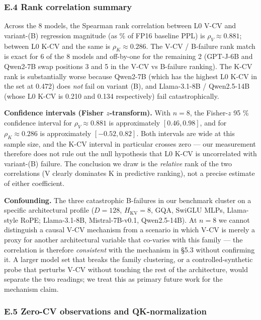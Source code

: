\subsubsection{E.4 Rank correlation
summary}\label{e.4-rank-correlation-summary}

Across the 8 models, the Spearman rank correlation between L0 V-CV and
variant-(B) regression magnitude (as \% of FP16 baseline PPL) is
\(\rho_V \approx 0.881\); between L0 K-CV and the same is
\(\rho_K \approx 0.286\). The V-CV / B-failure rank match is exact for 6
of the 8 models and off-by-one for the remaining 2 (GPT-J-6B and
Qwen2-7B swap positions 3 and 5 in the V-CV vs B-failure ranking). The
K-CV rank is substantially worse because Qwen2-7B (which has the highest
L0 K-CV in the set at 0.472) does \emph{not} fail on variant (B), and
Llama-3.1-8B / Qwen2.5-14B (whose L0 K-CV is 0.210 and 0.134
respectively) fail catastrophically.

\textbf{Confidence intervals (Fisher \(z\)-transform).} With \(n = 8\),
the Fisher-\(z\) 95 \% confidence interval for \(\rho_V \approx 0.881\)
is approximately \([0.46, 0.98]\), and for \(\rho_K \approx 0.286\) is
approximately \([-0.52, 0.82]\). Both intervals are wide at this sample
size, and the K-CV interval in particular crosses zero --- our
measurement therefore does not rule out the null hypothesis that L0 K-CV
is uncorrelated with variant-(B) failure. The conclusion we draw is the
\emph{relative} rank of the two correlations (V clearly dominates K in
predictive ranking), not a precise estimate of either coefficient.

\textbf{Confounding.} The three catastrophic B-failures in our benchmark
cluster on a specific architectural profile (\(D = 128\),
\(H_{\mathrm{KV}} = 8\), GQA, SwiGLU MLPs, Llama-style RoPE;
Llama-3.1-8B, Mistral-7B-v0.1, Qwen2.5-14B). At \(n = 8\) we cannot
distinguish a causal V-CV mechanism from a scenario in which V-CV is
merely a proxy for another architectural variable that co-varies with
this family --- the correlation is therefore \emph{consistent} with the
mechanism in §5.3 without confirming it. A larger model set that breaks
the family clustering, or a controlled-synthetic probe that perturbs
V-CV without touching the rest of the architecture, would separate the
two readings; we treat this as primary future work for the mechanism
claim.

\subsubsection{E.5 Zero-CV observations and
QK-normalization}\label{e.5-zero-cv-observations-and-qk-normalization}

